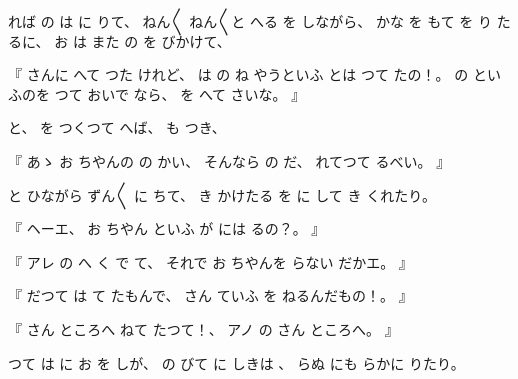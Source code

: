 %
れば
の
は
に
りて、
%
ねん〳〵
ねん〳〵と
へる
を
しながら、
%
かな
を
もて
を
り
たるに、
%
お
は
また
の
を
びかけて、

%
『
さんに
へて
つた
けれど、
%
は%
の
ね
やうといふ
とは
つて
たの！。
%
の
といふのを
つて
おいで
なら、
%
を
へて
さいな。
』

%
と、
%
を
つくつて
へば、
%
も
つき、

%
『
あゝ%
お
ちやんの
の
かい、
%
そんなら
の
だ、
%
れてつて
るべい。
』

%
と
ひながら
ずん〳〵
に
ちて、
%
き
かけたる
を
に
して
き
くれたり。

%
『
ヘーエ、
%
お
ちやん
といふ
が
には
るの？。
』

%
『
アレ
の
へ
く
で
て、
%
それで
お
ちやんを
らない
だかエ。
』

%
『
だつて
は
て
たもんで、
%
さん
ていふ
を
ねるんだもの！。
』

%
『
さん
ところへ
ねて
たつて！、
%
アノ
の
さん
ところへ。
』

%
つて
は
に
お
を
しが、
%
の
びて
に
しきは
、
%
%
らぬ
にも
らかに
りたり。

